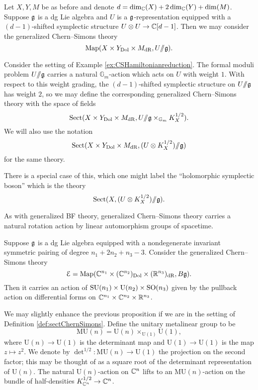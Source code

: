 \documentclass[10pt, oneside]{article}
\newcommand{\Gm}{\mathbb{G}_m}
\newcommand{\MU}{\mathrm{MU}}
\newcommand{\Sect}{\mathrm{Sect}}
\renewcommand{\U}{\mathrm{U}}
\newcommand{\ham}{/\!\!/}
\begin{document}
\begin{example}
Let $X,Y,M$ be as before and denote $d = \dim_\mathbb C(X) + 2\dim_\mathbb C(Y) + \dim(M)$. Suppose $\mathfrak g$ is a dg Lie algebra and $U$ is a $\mathfrak g$-representation equipped with a $(d-1)$-shifted symplectic structure $U\otimes U\rightarrow  \mathbb C[d-1]$. Then we may consider the generalized Chern--Simons theory
\[\map(X\times Y_{\mathrm{Dol}}\times M_{\mathrm{dR}}, U \ham \fg).\]
\label{ex:CSHamiltonianreduction}
\end{example}

\begin{example}
Consider the setting of Example \ref{ex:CSHamiltonianreduction}. The formal moduli problem $U\ham \fg$ carries a natural $\Gm$-action which acts on $U$ with weight $1$. With respect to this weight grading, the $(d-1)$-shifted symplectic structure on $U\ham \fg$ has weight $2$, so we may define the corresponding generalized Chern--Simons theory with the space of fields
\[\Sect(X\times Y_{\mr{Dol}}\times M_{\mr{dR}}, U\ham \fg\times_{\Gm} K_X^{1/2}).\]
We will also use the notation
\[\Sect(X\times Y_{\mr{Dol}}\times M_{\mr{dR}}, (U\otimes K_X^{1/2})\ham \fg)\]
for the same theory.
\end{example}

\begin{example}
There is a special case of this, which one might label the ``holomorphic symplectic boson'' \cite[Definition 4.8]{SWSuperconformal} which is the theory
\[\Sect(X, (U\otimes K_X^{1/2})\ham\fg) . \]
\end{example}

As with generalized BF theory, generalized Chern--Simons theory carries a natural rotation action by linear automorphism groups of spacetime.

\begin{prop}
Suppose $\mathfrak g$ is a dg Lie algebra equipped with a nondegenerate invariant symmetric pairing of degree $n_1+2n_2+n_3-3$. Consider the generalized Chern--Simons theory
\[\mathcal E = \operatorname{Map}(\mathbb C^{n_1}\times (\mathbb C^{n_2})_{\mathrm{Dol}}\times (\mathbb R^{n_3})_{\mathrm{dR}}, B\mathfrak g).\]
Then it carries an action of $\SU(n_1)\times \U(n_2)\times \SO(n_3)$ given by the pullback action on differential forms on $\mathbb C^{n_1}\times \mathbb C^{n_2}\times \mathbb R^{n_3}$.
\end{prop}

We may slightly enhance the previous proposition if we are in the setting of Definition \ref{def:sectChernSimons}. Define the unitary metalinear group to be
\[\MU(n) = \U(n)\times_{\U(1)} \U(1),\]
where $\U(n)\rightarrow \U(1)$ is the determinant map and $\U(1)\rightarrow \U(1)$ is the map $z\mapsto z^2$. We denote by $\det^{1/2}\colon \MU(n)\rightarrow \U(1)$ the projection on the second factor; this may be thought of as a square root of the determinant representation of $\U(n)$. The natural $\U(n)$-action on $\mathbb C^n$ lifts to an $\MU(n)$-action on the bundle of half-densities $K_{\mathbb C^n}^{1/2}\rightarrow \mathbb C^n$.
\end{document}
